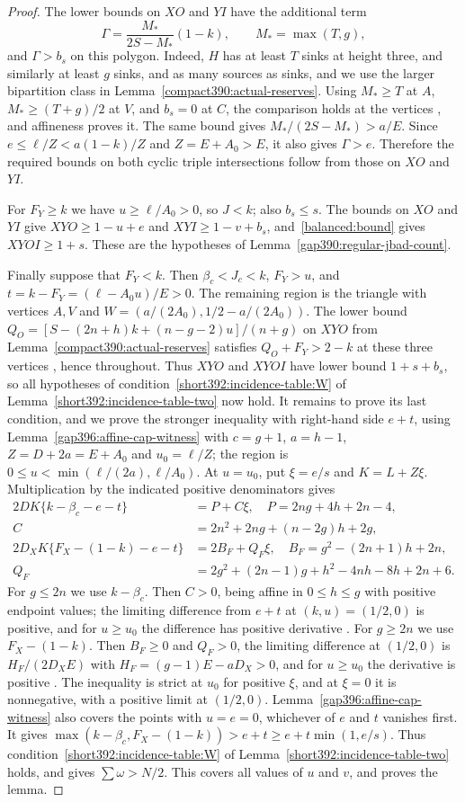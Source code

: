 \begin{proof}
The lower bounds on $XO$ and $YI$ have the additional term
\[
 \Gamma=\frac{M_*}{2S-M_*}(1-k),\qquad M_*=\max(T,g),
\]
and $\Gamma>b_s$ on this polygon.
Indeed, $H$ has at least $T$ sinks at height three, and similarly at least $g$ sinks, and as many sources as sinks, and we use the larger bipartition class in
Lemma~\ref{compact390:actual-reserves}. Using $M_*\ge T$ at $A$,
$M_*\ge(T+g)/2$ at $V$, and $b_s=0$ at $C$, the comparison holds at the
vertices , and affineness proves it.
The same bound gives $M_*/(2S-M_*)>a/E$.
Since $e\le\ell/Z<a(1-k)/Z$ and $Z=E+A_0>E$, it also
gives $\Gamma>e$. Therefore the required bounds on both cyclic triple intersections follow from those on $XO$ and $YI$.

For $F_Y\ge k$ we have $u\ge\ell/A_0>0$, so $J<k$;
also $b_s\le s$.
The bounds on $XO$ and $YI$ give $XYO\ge1-u+e$ and
$XYI\ge1-v+b_s$, and~\eqref{balanced:bound} gives $XYOI\ge1+s$.
These are the hypotheses of
Lemma~\ref{gap390:regular-jbad-count}.

Finally suppose that $F_Y<k$. Then $\beta_c<J_c<k$, $F_Y>u$,
and $t=k-F_Y=(\ell-A_0u)/E>0$.
The remaining region is the triangle with vertices $A,V$ and
$W=(a/(2A_0),1/2-a/(2A_0))$.
The lower bound $Q_O=[S-(2n+h)k+(n-g-2)u]/(n+g)$ on $XYO$ from Lemma~\ref{compact390:actual-reserves} satisfies
$Q_O+F_Y>2-k$ at these three vertices , hence throughout.
Thus $XYO$ and $XYOI$ have
lower bound $1+s+b_s$, so all hypotheses of
condition~\ref{short392:incidence-table:W} of Lemma~\ref{short392:incidence-table-two} now hold.
It remains to prove its last condition, and we prove the stronger inequality with right-hand side $e+t$,
using Lemma~\ref{gap396:affine-cap-witness}
with $c=g+1$, $a=h-1$, $Z=D+2a=E+A_0$ and $u_0=\ell/Z$;
the region is
$0\le u<\min(\ell/(2a),\ell/A_0)$.
At $u=u_0$, put $\xi=e/s$ and $K=L+Z\xi$. Multiplication by
the indicated positive denominators gives
\[
\begin{split}
 2DK\{k-\beta_c-e-t\}&=P+C\xi,\quad
 P=2ng+4h+2n-4,\\
 C&=2n^2+2ng+(n-2g)h+2g,\\
 2D_XK\{F_X-(1-k)-e-t\}&=2B_F+Q_F\xi,\quad
 B_F=g^2-(2n+1)h+2n,\\
 Q_F&=2g^2+(2n-1)g+h^2-4nh-8h+2n+6.
\end{split}
\]
For $g\le2n$ we use $k-\beta_c$. Then $C>0$, being affine in
$0\le h\le g$ with positive endpoint values; the limiting difference
from $e+t$ at $(k,u)=(1/2,0)$ is positive, and for $u\ge u_0$ the
difference has positive derivative .
For $g\ge2n$ we use $F_X-(1-k)$. Then $B_F\ge0$ and $Q_F>0$, the
limiting difference at $(1/2,0)$ is
$H_F/(2D_XE)$ with $H_F=(g-1)E-aD_X>0$, and for $u\ge u_0$ the
derivative is positive .
The inequality is strict at $u_0$ for positive $\xi$, and at $\xi=0$
it is nonnegative, with a positive limit at $(1/2,0)$. Lemma~\ref{gap396:affine-cap-witness} also covers the points with $u=e=0$, whichever
of $e$ and $t$ vanishes first.
It gives $\max(k-\beta_c,F_X-(1-k))>e+t\ge e+t\min(1,e/s)$.
Thus condition~\ref{short392:incidence-table:W} of Lemma~\ref{short392:incidence-table-two} holds, and gives $\sum\omega>N/2$. This covers all values of $u$ and $v$, and proves the lemma.
\end{proof}

